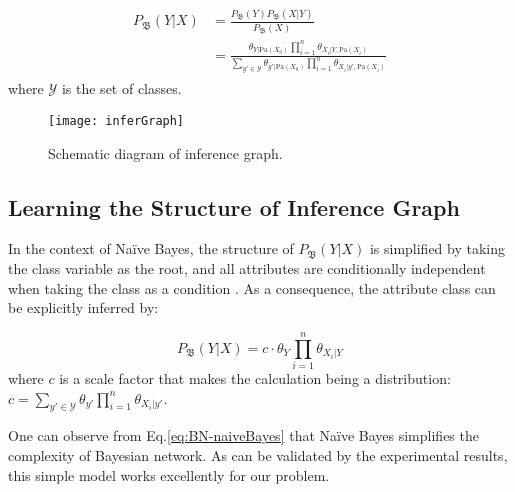 \vspace{-1ex}
\begin{align}\label{eq:BNWithCls}
\begin{split}
P_\mathfrak{B}(Y|{X}) & = 
\frac{ P_\mathfrak{B}(Y) P_\mathfrak{B}({X}|Y) }{P_\mathfrak{B}({X})}\\
&=\frac{ \theta_{Y|\text{Pa}({X}_0)} \prod_{i=1}^{n} \theta_{X_i|Y, \text{Pa}({X}_i)} }{ \sum_{y'\in \mathcal{Y}} \theta_{y'|\text{Pa}({X}_0)} \prod_{i=1}^{n} \theta_{X_i|y', \text{Pa}({X}_i)} }
\end{split}
\end{align}
where $\mathcal{Y}$ is the set of classes.

\begin{figure}[tb]
\centering
\texttt{[image: inferGraph]}
\caption{Schematic diagram of inference graph.}
\vspace{-4ex}
\label{fig:inferGraphWork}
\end{figure}

\subsection{Learning the Structure of Inference Graph}

In the context of Na\"{i}ve Bayes, 
the structure of $P_\mathfrak{B}(Y|{X})$ is simplified by taking the class variable as the root, and all attributes are conditionally independent when taking the class as a condition \cite{petitjean2018accurate}. As a consequence, the attribute class can be explicitly inferred by:

\begin{equation}\label{eq:BN-naiveBayes}
P_\mathfrak{B}(Y| {X}) = c \cdot \theta_Y \prod_{i=1}^{n}\theta_{X_i|Y}
\end{equation}
where $c$ is a scale factor that makes the calculation being a distribution: $c=\sum_{y'\in \mathcal{Y}}  \theta_{y'} \prod_{i=1}^{n}\theta_{X_i|y'}$.

One can observe from Eq.\eqref{eq:BN-naiveBayes} that Na\"{i}ve Bayes simplifies the complexity of Bayesian network. As can be validated by the experimental results, this simple model works excellently for our problem. 

